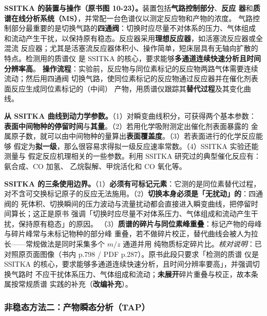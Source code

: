 \begin{measure}
\textbf{SSITKA 的装置与操作（原书图 10-23）。}装置包括\textbf{气路控制部分}、\textbf{反应
器}和\textbf{质谱在线分析系统（MS）}，并常配一台色谱仪以测定反应物和产物的浓度。
气路控制部分最重要的是切换气路的\textbf{四通阀}：切换时应尽量不对体系的压力、气体组成
和流动产生干扰，以保持原有稳态。反应器采用\textbf{理想反应器}，如活塞流反应器或全混流
反应器；尤其是活塞流反应器体积小、操作简单，短床层具有无轴向扩散的特点。检测用的质谱仪
是 SSITKA 的核心，要求能够\textbf{多通道连续快速分析且时间分辨率高}。
\textbf{操作流程}：实验前，反应物与同位素标记的反应物两路气体需要连续流动；然后用四通阀
切换气路，使同位素标记的反应物通过反应器并在催化剂表面反应生成同位素标记的（中间）
产物，用质谱仪跟踪其\textbf{替代过程}及其变化曲线。
\end{measure}

\begin{dataflow}
\textbf{从 SSITKA 曲线到动力学参数。}（1）对瞬变曲线积分，可获得两个基本参数：
\textbf{表面中间物种的停留时间}与\textbf{其量}。（2）若用化学吸附测定出催化剂表面暴露的
金属原子数，就可以由中间物种的量算出\textbf{表面覆盖度}。（3）若表面进行的化学反应能够
假定为\textbf{拟一级}，那么很容易求得拟一级反应速率常数。（4）SSITKA 实验还能测量与
假定反应机理相关的一些参数。利用 SSITKA 研究过的典型催化反应有：氨合成、CO 加氢、
乙烷裂解、甲烷活化和 CO 氧化等。
\end{dataflow}

\begin{pitfall}
\textbf{SSITKA 的三条使用边界。}（1）\textbf{必须有可标记元素}：它测的是同位素替代过程，
对不含可交换标记原子的反应无法施用。（2）\textbf{切换本身必须是「无扰动」的}：四通阀的
死体积、切换瞬间的压力波动与流量扰动都会直接进入瞬变曲线，把停留时间算长；这正是原书
强调「切换时应尽量不对体系压力、气体组成和流动产生干扰，保持原有稳态」的原因。
（3）\textbf{质谱的碎片与同位素峰重叠}：标记产物的母峰与碎片峰常与未标记物种的部分峰
重叠，若不做碎片校正，替代曲线会被人为拉长——常规做法是同时采集多个 $m/z$ 通道并用
纯物质标定碎片比。\emph{核对说明}：已对照原页面图像（书内 p.798 / PDF p.287）。原书此段只要求「检测的质谱
仪是 SSITKA 的核心，要求能够多通道连续快速分析，且时间分辨率要高」，并强调切换气路时
不应干扰体系压力、气体组成和流动；\textbf{未展开}碎片重叠与校正，故本条属按常规质谱
实践的补充（\textbf{改编补充}）。
\end{pitfall}

\subsubsection{非稳态方法二：产物瞬态分析（TAP）}

